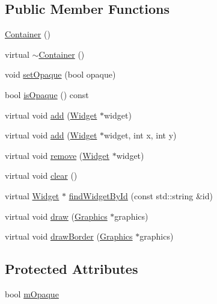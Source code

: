 \subsection*{Public Member Functions}
\begin{DoxyCompactItemize}
\item 
\hyperlink{classgcn_1_1Container_a9b7bc2cf017eb3ed6a855688cf57322a}{Container} ()
\item 
virtual \hyperlink{classgcn_1_1Container_a3384a372ea00af8cce5b88dd614a9b30}{$\sim$\+Container} ()
\item 
void \hyperlink{classgcn_1_1Container_ae98ebff48adcfc7f95ac44b28864f36a}{set\+Opaque} (bool opaque)
\item 
bool \hyperlink{classgcn_1_1Container_a458c9f8e2a6dd5373e666a6fe62ec719}{is\+Opaque} () const 
\item 
virtual void \hyperlink{classgcn_1_1Container_a183a60d39fc503b7e37c71491105f766}{add} (\hyperlink{classgcn_1_1Widget}{Widget} $\ast$widget)
\item 
virtual void \hyperlink{classgcn_1_1Container_aa78a475e596e8261d4187ef58338e5ab}{add} (\hyperlink{classgcn_1_1Widget}{Widget} $\ast$widget, int x, int y)
\item 
virtual void \hyperlink{classgcn_1_1Container_a6ed5e946da5112c8b86d708c9000274e}{remove} (\hyperlink{classgcn_1_1Widget}{Widget} $\ast$widget)
\item 
virtual void \hyperlink{classgcn_1_1Container_a561436ebcebc3419545a4db3397c6686}{clear} ()
\item 
virtual \hyperlink{classgcn_1_1Widget}{Widget} $\ast$ \hyperlink{classgcn_1_1Container_a7871002a444dba6ad82df1dcef61561b}{find\+Widget\+By\+Id} (const std\+::string \&id)
\item 
virtual void \hyperlink{classgcn_1_1Container_a0bc3386f5564165fcb13e9d389a96432}{draw} (\hyperlink{classgcn_1_1Graphics}{Graphics} $\ast$graphics)
\item 
virtual void \hyperlink{classgcn_1_1Container_a0bb6aecc841e06a887f32905b561180b}{draw\+Border} (\hyperlink{classgcn_1_1Graphics}{Graphics} $\ast$graphics)
\end{DoxyCompactItemize}
\subsection*{Protected Attributes}
\begin{DoxyCompactItemize}
\item 
bool \hyperlink{classgcn_1_1Container_a4fd62e01a8196c69c83e751af45a5ade}{m\+Opaque}
\end{DoxyCompactItemize}

